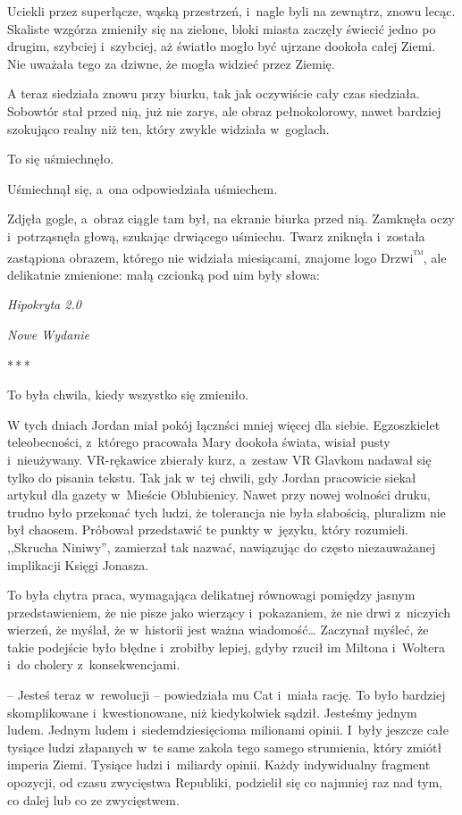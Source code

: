 \documentclass[oneside,polish,11pt,sfheadings]{mwbk}
\newcommand{\threeast}{\bigskip\par\centerline{*\,*\,*}\medskip\par}%
\begin{document}
Uciekli przez superłącze, wąską przestrzeń, i~nagle byli na zewnątrz,
znowu lecąc. Skaliste wzgórza zmieniły się na zielone, bloki miasta
zaczęły świecić jedno po drugim, szybciej i~szybciej, aż światło mogło
być ujrzane dookoła całej Ziemi. Nie uważała tego za dziwne, że mogła
widzieć przez Ziemię.

A teraz siedziała znowu przy biurku, tak jak oczywiście cały czas
siedziała. Sobowtór stał przed nią, już nie zarys, ale obraz
pełnokolorowy, nawet bardziej szokująco realny niż ten, który zwykle
widziała w~goglach.

To się uśmiechnęło.

Uśmiechnął się, a~ona odpowiedziała uśmiechem.

Zdjęła gogle, a~obraz ciągle tam był, na ekranie biurka przed nią.
Zamknęła oczy i~potrząsnęła głową, szukając drwiącego uśmiechu. Twarz
zniknęła i~została zastąpiona obrazem, którego nie widziała miesiącami,
znajome logo Drzwi\textsuperscript{™}, ale delikatnie zmienione: małą
czcionką pod nim były słowa:

\emph{Hipokryta 2.0}

\emph{Nowe Wydanie}

\threeast

To była chwila, kiedy wszystko się zmieniło.

W tych dniach Jordan miał pokój łącznści mniej więcej dla siebie.
Egzoszkielet teleobecności, z~którego pracowała Mary dookoła świata,
wisiał pusty i~nieużywany. VR-rękawice zbierały kurz, a~zestaw VR
Glavkom nadawał się tylko do pisania tekstu. Tak jak w~tej chwili, gdy
Jordan pracowicie siekał artykuł dla gazety w~Mieście Oblubienicy. Nawet
przy nowej wolności druku, trudno było przekonać tych ludzi, że
tolerancja nie była słabością, pluralizm nie był chaosem. Próbował
przedstawić te punkty w~języku, który rozumieli. ,,Skrucha Niniwy'',
zamierzał tak nazwać, nawiązując do często niezauważanej implikacji
Księgi Jonasza.

To była chytra praca, wymagająca delikatnej równowagi pomiędzy jasnym
przedstawieniem, że nie pisze jako wierzący i~pokazaniem, że nie drwi z~niczyich wierzeń, że myślał, że w~historii jest ważna wiadomość\ldots
Zaczynał myśleć, że takie podejście było błędne i~zrobiłby lepiej, gdyby
rzucił im Miltona i~Woltera i~do cholery z~konsekwencjami.

-- Jesteś teraz w~rewolucji -- powiedziała mu Cat i~miała rację. To było
bardziej skomplikowane i~kwestionowane, niż kiedykolwiek sądził.
Jesteśmy jednym ludem. Jednym ludem i~siedemdziesięcioma milionami
opinii. I~były jeszcze całe tysiące ludzi złapanych w~te same zakola
tego samego strumienia, który zmiótł imperia Ziemi. Tysiące ludzi i~miliardy opinii. Każdy indywidualny fragment opozycji, od czasu
zwycięstwa Republiki, podzielił się co najmniej raz nad tym, co dalej
lub co ze zwycięstwem.
\end{document}
